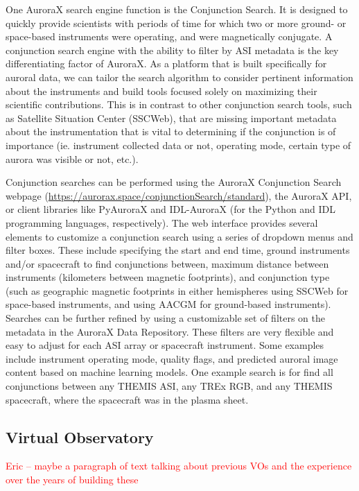\documentclass[utf8]{FrontiersinHarvard} %
\begin{document}
One AuroraX search engine function is the Conjunction Search. It is designed to quickly provide scientists with periods of time for which two or more ground- or space-based instruments were operating, and were magnetically conjugate. A conjunction search engine with the ability to filter by ASI metadata is the key differentiating factor of AuroraX. As a platform that is built specifically for auroral data, we can tailor the search algorithm to consider pertinent information about the instruments and build tools focused solely on maximizing their scientific contributions. This is in contrast to other conjunction search tools, such as Satellite Situation Center (SSCWeb), that are missing important metadata about the instrumentation that is vital to determining if the conjunction is of importance (ie. instrument collected data or not, operating mode, certain type of aurora was visible or not, etc.).

Conjunction searches can be performed using the AuroraX Conjunction Search webpage (\url{https://aurorax.space/conjunctionSearch/standard}), the AuroraX API, or client libraries like PyAuroraX and IDL-AuroraX (for the Python and IDL programming languages, respectively). The web interface provides several elements to customize a conjunction search using a series of dropdown menus and filter boxes. These include specifying the start and end time, ground instruments and/or spacecraft to find conjunctions between, maximum distance between instruments (kilometers between magnetic footprints), and conjunction type (such as geographic magnetic footprints in either hemispheres using SSCWeb for space-based instruments, and using AACGM \citep{Shepherd2014} for ground-based instruments). Searches can be further refined by using a customizable set of filters on the metadata in the AuroraX Data Repository. These filters are very flexible and easy to adjust for each ASI array or spacecraft instrument. Some examples include instrument operating mode, quality flags, and predicted auroral image content based on machine learning models. One example search is for find all conjunctions between any THEMIS ASI, any TREx RGB, and any THEMIS spacecraft, where the spacecraft was in the plasma sheet.

\subsection{Virtual Observatory}
\textcolor{red}{Eric – maybe a paragraph of text talking about previous VOs and the experience over the years of building these}
\end{document}
